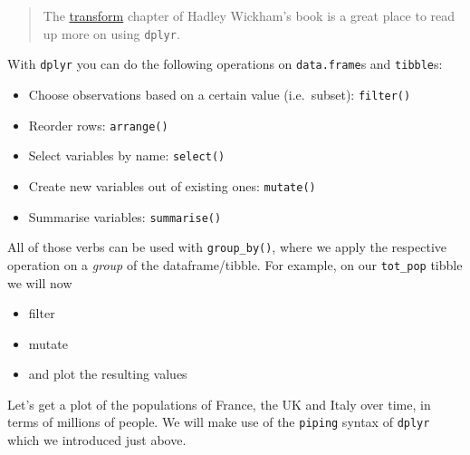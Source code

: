 \documentclass[]{book}
\providecommand{\tightlist}{%
  \setlength{\itemsep}{0pt}\setlength{\parskip}{0pt}}
\begin{document}
\begin{quote}
The \href{http://r4ds.had.co.nz/transform.html}{transform} chapter of Hadley Wickham's book is a great place to read up more on using \texttt{dplyr}.
\end{quote}

With \texttt{dplyr} you can do the following operations on \texttt{data.frame}s and \texttt{tibble}s:

\begin{itemize}
\tightlist
\item
  Choose observations based on a certain value (i.e.~subset): \texttt{filter()}
\item
  Reorder rows: \texttt{arrange()}
\item
  Select variables by name: \texttt{select()}
\item
  Create new variables out of existing ones: \texttt{mutate()}
\item
  Summarise variables: \texttt{summarise()}
\end{itemize}

All of those verbs can be used with \texttt{group\_by()}, where we apply the respective operation on a \emph{group} of the dataframe/tibble. For example, on our \texttt{tot\_pop} tibble we will now

\begin{itemize}
\tightlist
\item
  filter
\item
  mutate
\item
  and plot the resulting values
\end{itemize}

Let's get a plot of the populations of France, the UK and Italy over time, in terms of millions of people. We will make use of the \texttt{piping} syntax of \texttt{dplyr} which we introduced just above.
\end{document}
